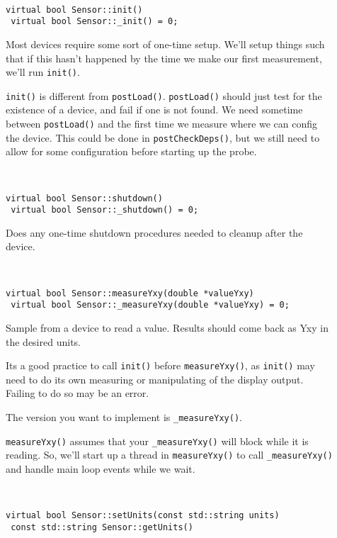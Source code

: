 \begin{description}

\item[] \
\begin{lstlisting}[frame=single]
 virtual bool Sensor::init()
 virtual bool Sensor::_init() = 0;
\end{lstlisting}

Most devices require some sort of one-time setup. We'll
setup things such that if this hasn't happened by the 
time we make our first measurement, we'll run {\tt init()}.

{\tt init()} is different from {\tt postLoad()}. {\tt postLoad()}
should
just test for the existence of a device, and fail if one
is not found. We need sometime between {\tt postLoad()} and
the first time we measure where we can config the device.
This could be done in {\tt postCheckDeps()}, but we still 
need to allow for some configuration before starting up the 
probe.


\item[] \
\begin{lstlisting}[frame=single]
 virtual bool Sensor::shutdown()
 virtual bool Sensor::_shutdown() = 0;
\end{lstlisting}

Does any one-time shutdown procedures needed to cleanup
after the device.


\item[] \
\begin{lstlisting}[frame=single]
 virtual bool Sensor::measureYxy(double *valueYxy)
 virtual bool Sensor::_measureYxy(double *valueYxy) = 0;
\end{lstlisting}

Sample from a device to read a value. Results should
come back as Yxy in the desired units. 

Its a good practice to call {\tt init()} before {\tt measureYxy()},     
as {\tt init()} may need to do its own measuring or manipulating
of the display output. Failing to do so may be an error.

The version you want to implement is {\tt \_measureYxy()}.

{\tt measureYxy()} assumes that your {\tt \_measureYxy()} will block while
it is reading. So, we'll start up a thread in {\tt measureYxy()} to call
{\tt \_measureYxy()} and handle main loop events while we wait.


\item[] \
\begin{lstlisting}[frame=single]
 virtual bool Sensor::setUnits(const std::string units)
 const std::string Sensor::getUnits()
\end{lstlisting}


\end{description}
